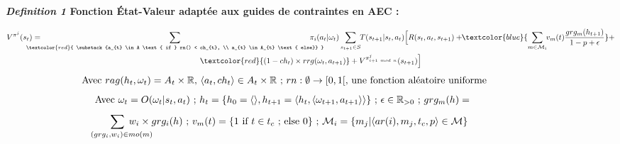 \begin{figure}[h!]
  \label{eq:single_value_function}
  \raggedright
  \textbf{\textit{Definition 1} \quad Fonction État-Valeur adaptée aux guides de contraintes en AEC :}

  \begin{scriptsize}
    \vspace{-0.6cm}
    \begin{gather*}
      V^{\pi^j}(s_t) = \hspace{-0.75cm}
      \sum_{\textcolor{red}{ \substack{a_{t} \in A \text{ if } rn() < ch_{t}, \\
            a_{t} \in A_{t} \text{ else}}
        }}{\hspace{-0.7cm} \pi_i(a_{t} | \omega_t)}
      \sum_{s_{t+1} \in S}
      {\hspace{-0.1cm} T(s_{t+1} | s_t, a_{t})
      \Bigl[R(s_t,a_{t},s_{t+1}) + \hspace{-0.1cm}
      \textcolor{blue}{ \sum_{m \in \mathcal{M}_i}{ \hspace{-0.1cm} v_m(t) \frac{grg_m(h_{t+1})}{1 - p + \epsilon} } }
      + } \\
      {\textcolor{red}{(1-ch_t) \times rrg(\omega_t,a_{t+1})} + V^{\pi^j_{i+1 \ mod \ n}}(s_{t+1})\Bigr]}
    \end{gather*}
    \vspace{-0.5cm}
    \textcolor{red}{\[\text{ \hspace{-0.1cm} Avec } rag(h_t, \omega_t) = A_{t} \times \mathbb{R} \text{, } \langle a_t, ch_{t} \rangle \in A_{t} \times \mathbb{R} \text{ ; } rn: \emptyset \to [0,1[ \text{, une fonction aléatoire uniforme}\]}
    \vspace{-0.6cm}
    \textcolor{blue}{
      \begin{gather*}
        \hspace{-0.001cm}
        \text{Avec } \omega_t = O(\omega_t | s_t, a_t) \text{ ; } h_t = \{h_0 = \langle \rangle, h_{t+1} = \langle h_t, \langle \omega_{t+1}, a_{t+1} \rangle \rangle \} \text{ ; } \epsilon \in \mathbb{R}_{>0} \text{ ; } grg_m(h) =
      \end{gather*}
    }
    \vspace{-0.95cm}
    \textcolor{blue}{
      \begin{gather*}
        \hspace{-0.5cm} \sum_{\hspace{0.3cm}(grg_i,w_i) \in mo(m)}{\hspace{-0.9cm} w_i \times grg_i(h)}
        \text{ ; } v_m(t) = \{ 1 \text{ if } t \in t_c \text{ ; else } 0 \} \text{ ; } \mathcal{M}_i = \{m_j | \langle ar(i),m_j,t_c,p \rangle \in \mathcal{M}\}
      \end{gather*}
    }
    \vspace{-0.6cm}
  \end{scriptsize}

\end{figure}

